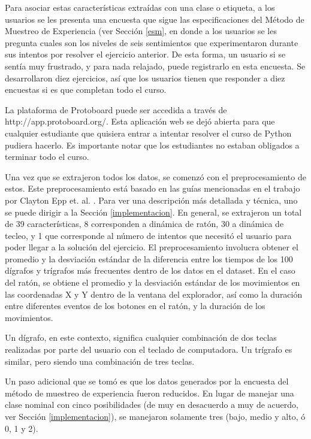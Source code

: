 Para asociar estas características extraídas con una clase o etiqueta,
a los usuarios se les presenta una encuesta que sigue las
especificaciones del Método de Muestreo de Experiencia (ver Sección
\ref{esm}, en donde a los usuarios se les pregunta cuales son los
niveles de seis sentimientos que experimentaron durante sus intentos
por resolver el ejercicio anterior. De esta forma, un usuario si se
sentía muy frustrado, y para nada relajado, puede registrarlo en esta
encuesta. Se desarrollaron diez ejercicios, así que los usuarios
tienen que responder a diez encuestas si es que completan todo el
curso.

La plataforma de Protoboard puede ser accedida a través de
http://app.protoboard.org/.
Esta aplicación web se dejó
abierta para que cualquier estudiante que quisiera entrar a intentar
resolver el curso de Python pudiera hacerlo. Es importante notar que
los estudiantes no estaban obligados a terminar todo el curso.

Una vez que se extrajeron todos los datos, se comenzó con el
preprocesamiento de estos. Este preprocesamiento está basado en las
guías mencionadas en el trabajo por Clayton Epp
et. al. \cite{epp2011identifying}. Para ver una descripción más
detallada y técnica, uno se puede dirigir a la Sección
\ref{implementacion}. En general, se extrajeron un total de 39
características, 8 corresponden a dinámica de ratón, 30 a dinámica de
tecleo, y 1 que corresponde al número de intentos que necesitó el
usuario para poder llegar a la solución del ejercicio. El
preprocesamiento involucra obtener el promedio y la desviación
estándar de la diferencia entre los tiempos de los 100 dígrafos y
trígrafos más frecuentes dentro de los datos en el dataset. En el caso
del ratón, se obtiene el promedio y la desviación estándar de los
movimientos en las coordenadas X y Y dentro de la ventana del
explorador, así como la duración entre diferentes eventos de los
botones en el ratón, y la duración de los movimientos.

Un dígrafo, en este contexto, significa cualquier combinación de dos
teclas realizadas por parte del usuario con el teclado de
computadora. Un trígrafo es similar, pero siendo una combinación de
tres teclas.

Un paso adicional que se tomó es que los datos generados por la
encuesta del método de muestreo de experiencia fueron reducidos. En
lugar de manejar una clase nominal con cinco posibilidades (de muy en
desacuerdo a muy de acuerdo, ver Sección \ref{implementacion}), se
manejaron solamente tres (bajo, medio y alto, ó 0, 1 y 2).

